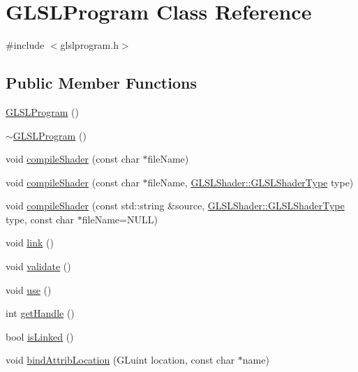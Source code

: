 \hypertarget{class_g_l_s_l_program}{}\section{G\+L\+S\+L\+Program Class Reference}
\label{class_g_l_s_l_program}


{\ttfamily \#include $<$glslprogram.\+h$>$}

\subsection*{Public Member Functions}
\begin{DoxyCompactItemize}
\item 
\mbox{\hyperlink{class_g_l_s_l_program_a9a93ab534634ee4abfda2f216008e553}{G\+L\+S\+L\+Program}} ()
\item 
\mbox{\hyperlink{class_g_l_s_l_program_aec786fecfa03b6aaa3c70f8da3c05a02}{$\sim$\+G\+L\+S\+L\+Program}} ()
\item 
void \mbox{\hyperlink{class_g_l_s_l_program_a7ac90d2adc456b0bd71fae53ab76812c}{compile\+Shader}} (const char $\ast$file\+Name)
\item 
void \mbox{\hyperlink{class_g_l_s_l_program_af69e0c7d69ad386b150e5bb9ae66bf26}{compile\+Shader}} (const char $\ast$file\+Name, \mbox{\hyperlink{namespace_g_l_s_l_shader_a5da03bdfde28d414fcf090182b3b8177}{G\+L\+S\+L\+Shader\+::\+G\+L\+S\+L\+Shader\+Type}} type)
\item 
void \mbox{\hyperlink{class_g_l_s_l_program_aa6dc9e2153e3cd83ff24042be9805077}{compile\+Shader}} (const std\+::string \&source, \mbox{\hyperlink{namespace_g_l_s_l_shader_a5da03bdfde28d414fcf090182b3b8177}{G\+L\+S\+L\+Shader\+::\+G\+L\+S\+L\+Shader\+Type}} type, const char $\ast$file\+Name=N\+U\+LL)
\item 
void \mbox{\hyperlink{class_g_l_s_l_program_adba8352af3d733cd6644f07e8512c38f}{link}} ()
\item 
void \mbox{\hyperlink{class_g_l_s_l_program_af15950a7ce467792fcc17430d03c5e31}{validate}} ()
\item 
void \mbox{\hyperlink{class_g_l_s_l_program_a0ea2aeacb4361b37f145246430134bb6}{use}} ()
\item 
int \mbox{\hyperlink{class_g_l_s_l_program_aa630d9d45c1fc992aac91a7d1eb92e08}{get\+Handle}} ()
\item 
bool \mbox{\hyperlink{class_g_l_s_l_program_ad0d1efa38db415e35d9a329a93828815}{is\+Linked}} ()
\item 
void \mbox{\hyperlink{class_g_l_s_l_program_a54589ae245f6fac51f79a6617c91240b}{bind\+Attrib\+Location}} (G\+Luint location, const char $\ast$name)

\end{DoxyCompactItemize}
